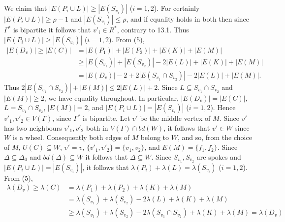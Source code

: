 We claim that $|E(P_i \cup L)| \ge |E(S_{v_i})|$ ($i = 1, 2$). For certainly $|E(P_i \cup L)| \ge \rho - 1$ and $|E(S_{v_i})| \le \rho$, and if equality holds in both then since $\Gamma^*$ is bipartite it follows that $v'_i \in R^*$, contrary to 13.1. Thus $|E(P_i \cup L)| \ge |E(S_{v_i})|$ ($i = 1, 2$). From (5),
\begin{align*}
|E(D_v)| \ge |E(C)| &= |E(P_1)| + |E(P_2)| + |E(K)| + |E(M)| \\
&\ge |E(S_{v_1})| + |E(S_{v_2})| - 2|E(L)| + |E(K)| + |E(M)| \\
&= |E(D_v)| - 2 + 2|E(S_{v_1} \cap S_{v_2})| - 2|E(L)| + |E(M)|.
\end{align*}
Thus $2|E(S_{v_1} \cap S_{v_2})| + |E(M)| \le 2|E(L)| + 2$. Since $L \subseteq S_{v_1} \cap S_{v_2}$ and $|E(M)| \ge 2$, we have equality throughout. In particular, $|E(D_v)| = |E(C)|$, $L = S_{v_1} \cap S_{v_2}$, $|E(M)| = 2$, and $|E(P_i \cup L)| = |E(S_{v_i})|$ ($i = 1, 2$). Hence $v'_1, v'_2 \in V(\Gamma)$, since $\Gamma^*$ is bipartite. Let $v'$ be the middle vertex of $M$. Since $v'$ has two neighbours $v'_1, v'_2$ both in $V(\Gamma) \cap bd(W)$, it follows that $v' \in W$ since $W$ is a wheel. Consequently both edges of $M$ belong to $W$, and so, from the choice of $M$, $U(C) \subseteq W$, $v' = v$, $\{v'_1, v'_2\} = \{v_1, v_2\}$, and $E(M) = \{f_1, f_2\}$. Since $\Delta \subseteq \Delta_0$ and $bd(\Delta) \subseteq W$ it follows that $\Delta \subseteq W$. Since $S_{v_1}, S_{v_2}$ are spokes and $|E(P_i \cup L)| = |E(S_{v_i})|$, it follows that $\lambda(P_i) + \lambda(L) = \lambda(S_{v_i})$ ($i = 1, 2$). From (5),
\begin{align*}
\lambda(D_v) \ge \lambda(C) &= \lambda(P_1) + \lambda(P_2) + \lambda(K) + \lambda(M) \\
&= \lambda(S_{v_1}) + \lambda(S_{v_2}) - 2\lambda(L) + \lambda(K) + \lambda(M) \\
&\ge \lambda(S_{v_1}) + \lambda(S_{v_2}) - 2\lambda(S_{v_1} \cap S_{v_2}) + \lambda(K) + \lambda(M) = \lambda(D_v)
\end{align*}
